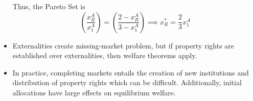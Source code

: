 \documentclass[twoside]{article}
\begin{document}
\begin{itemize}
\begin{center}
\end{center}
Thus, the Pareto Set is 
\[\left(\frac{x_R^A}{x_1^A}\right) = \left(\frac{2 - x_R^A}{3-x_1^A} \right) \implies x_R^* = \frac{2}{3}x_1^A\]
\item Externalities create missing-market problem, but if property rights are established over externalities, then welfare theorems apply.
\item In practice, completing markets entails the creation of new institutions and distribution of property rights which can be difficult. Additionally, initial allocations have large effects on equilibrium welfare. 
\end{itemize}
\end{document}
